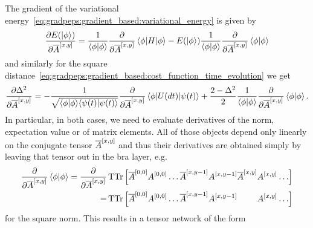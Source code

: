 The gradient of the variational energy~\eqref{eq:gradpeps:gradient_based:variational_energy} is given by
\begin{equation}
    \frac{\partial E(\ket{\phi})}{\partial \conj{A}^{[x,y]}}
    = \frac{1}{\braket{\phi}{\phi}} \frac{\partial}{\partial \conj{A}^{[x,y]}} \braopket{\phi}{H}{\phi} - E(\ket{\phi}) \frac{1}{\braket{\phi}{\phi}} \frac{\partial}{\partial \conj{A}^{[x,y]}} \braket{\phi}{\phi}
\end{equation}
and similarly for the square distance~\eqref{eq:gradpeps:gradient_based:cost_function_time_evolution} we get
\begin{equation}
    \frac{\partial \Delta^2}{\partial \conj{A}^{[x,y]}}
    =
    - \frac{1}{\sqrt{\braket{\phi}{\phi} \braket{\psi(t)}{\psi(t)}}} \frac{\partial}{\partial \conj{A}^{[x,y]}} \braopket{\phi}{U(dt)}{\psi(t)}
    + \frac{2 - \Delta^2}{2} \frac{1}{\braket{\phi}{\phi}} \frac{\partial}{\partial \conj{A}^{[x,y]}} \braket{\phi}{\phi}
    .
\end{equation}
%
In particular, in both cases, we need to evaluate derivatives of the norm, expectation value or of matrix elements.
%
All of those objects depend only linearly on the conjugate tensor $\overline{A}^{[x,y]}$ and thus their derivatives are obtained simply by leaving that tensor out in the bra layer, e.g.
\begin{align}
\begin{split}
    \label{eq:gradpeps:approx_contraction:derivative_norm_diagram_exact}
    \frac{\partial}{\partial \conj{A}^{[x,y]}} \braket{\phi}{\phi}
    = \frac{\partial}{\partial \conj{A}^{[x,y]}}
    &\tensortr\sBr{\conj{A}^{[0,0]} A^{[0,0]} \dots \conj{A}^{[x,y-1]} A^{[x,y-1]} \conj{A}^{[x,y]} A^{[x,y]} \dots }
    \\
    = 
    &\tensortr\sBr{\conj{A}^{[0,0]} A^{[0,0]} \dots \conj{A}^{[x,y-1]} A^{[x,y-1]} \hphantom{\conj{A}^{[x,y]}} A^{[x,y]} \dots }
\end{split}
\end{align}
for the square norm.
%
This results in a tensor network of the form
